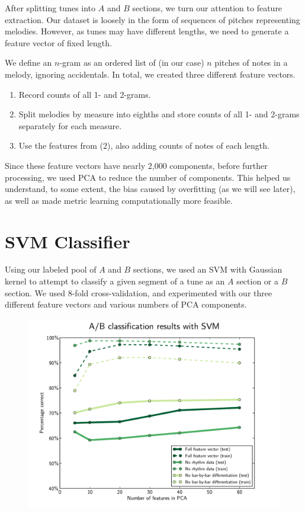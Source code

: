 \documentclass{article} %
\begin{document}
After splitting tunes into $A$ and $B$ sections, we turn our attention to
feature extraction.  Our dataset is loosely in the form of sequences of pitches
representing melodies. However, as tunes may have different lengths, we need to
generate a feature vector of fixed length.

We define an $n$-gram as an ordered list of (in our case) $n$ pitches of notes
in a melody, ignoring accidentals. In total, we created three different feature
vectors.
\begin{enumerate}
\item Record counts of all 1- and 2-grams.

\item Split melodies by measure into eighths and store counts of all 1- and
2-grams separately for each measure.

\item Use the features from (2), also adding counts of notes of each length.
\end{enumerate}

Since these feature vectors have nearly 2,000 components, before further
processing, we used PCA to reduce the number of components. This helped us
understand, to some extent, the bias caused by overfitting (as we will see
later), as well as made metric learning computationally more feasible.

\section{SVM Classifier}
Using our labeled pool of $A$ and $B$ sections, we used an SVM with Gaussian
kernel to attempt to classify a given segment of a tune as an $A$ section or a
$B$ section. We used 8-fold cross-validation, and experimented with our three
different feature vectors and various numbers of PCA components.


\begin{figure}
\includegraphics[width=5in]{../svm_results/svm.pdf}
\end{figure}
\end{document}
